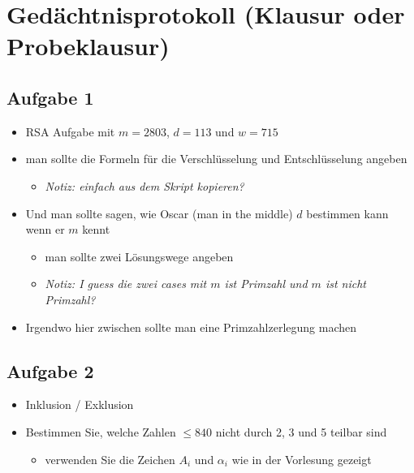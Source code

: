 \section{Gedächtnisprotokoll (Klausur oder Probeklausur)}

\subsection{Aufgabe 1}
\begin{aufgabe}[Aufgabe 1]
\begin{itemize}
  \item RSA Aufgabe mit $m = 2803$, $d = 113$ und $w = 715$
  \item man sollte die Formeln für die Verschlüsselung und Entschlüsselung angeben
  \begin{itemize}
    \item \textit{Notiz: einfach aus dem Skript kopieren?}
  \end{itemize}
  \item Und man sollte sagen, wie Oscar (man in the middle) $d$ bestimmen kann wenn er $m$ kennt
  \begin{itemize}
    \item man sollte zwei Lösungswege angeben
    \item \textit{Notiz: I guess die zwei cases mit $m$ ist Primzahl und $m$ ist nicht Primzahl?}
  \end{itemize}
  \item Irgendwo hier zwischen sollte man eine Primzahlzerlegung machen
\end{itemize}
\end{aufgabe}

\subsection{Aufgabe 2}
\begin{aufgabe}[Aufgabe 2]
\begin{itemize}
  \item Inklusion / Exklusion
  \item Bestimmen Sie, welche Zahlen $\le 840$ nicht durch 2, 3 und 5 teilbar sind
  \begin{itemize}
    \item verwenden Sie die Zeichen $A_i$ und $\alpha_i$ wie in der Vorlesung gezeigt
  \end{itemize}
\end{itemize}
\end{aufgabe}

